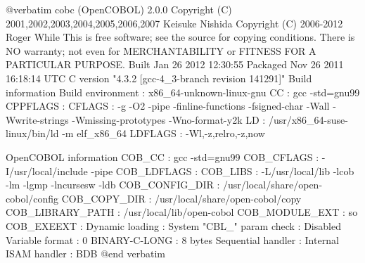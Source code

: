 @verbatim
cobc (OpenCOBOL) 2.0.0
Copyright (C) 2001,2002,2003,2004,2005,2006,2007 Keisuke Nishida
Copyright (C) 2006-2012 Roger While
This is free software; see the source for copying conditions.  There is NO
warranty; not even for MERCHANTABILITY or FITNESS FOR A PARTICULAR PURPOSE.
Built     Jan 26 2012 12:30:55
Packaged  Nov 26 2011 16:18:14 UTC
C version "4.3.2 [gcc-4_3-branch revision 141291]"
Build information
Build environment        : x86_64-unknown-linux-gnu
CC                       : gcc -std=gnu99
CPPFLAGS                 : 
CFLAGS                   : -g -O2 -pipe -finline-functions -fsigned-char
                           -Wall -Wwrite-strings -Wmissing-prototypes
                           -Wno-format-y2k
LD                       : /usr/x86_64-suse-linux/bin/ld -m elf_x86_64
LDFLAGS                  : -Wl,-z,relro,-z,now

OpenCOBOL information
COB_CC                   : gcc -std=gnu99
COB_CFLAGS               : -I/usr/local/include -pipe
COB_LDFLAGS              : 
COB_LIBS                 : -L/usr/local/lib -lcob -lm -lgmp -lncursesw
                           -ldb
COB_CONFIG_DIR           : /usr/local/share/open-cobol/config
COB_COPY_DIR             : /usr/local/share/open-cobol/copy
COB_LIBRARY_PATH         : /usr/local/lib/open-cobol
COB_MODULE_EXT           : so
COB_EXEEXT               : 
Dynamic loading          : System
"CBL_" param check       : Disabled
Variable format          : 0
BINARY-C-LONG            : 8 bytes
Sequential handler       : Internal
ISAM handler             : BDB
@end verbatim


